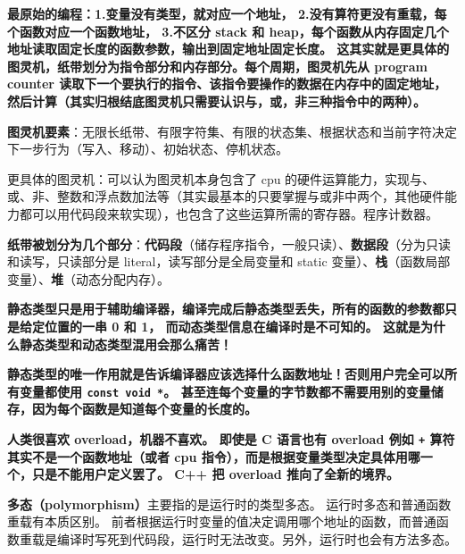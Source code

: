 
\begin{issues}
\issueDraft
\end{issues}

\textbf{最原始的编程：1.变量没有类型，就对应一个地址， 2.没有算符更没有重载，每个函数对应一个函数地址， 3.不区分 stack 和 heap，每个函数从内存固定几个地址读取固定长度的函数参数，输出到固定地址固定长度。 这其实就是更具体的图灵机，纸带划分为指令部分和内存部分。每个周期，图灵机先从 program counter 读取下一个要执行的指令、该指令要操作的数据在内存中的固定地址，然后计算（其实归根结底图灵机只需要认识与，或，非三种指令中的两种）。}

\textbf{图灵机要素}：无限长纸带、有限字符集、有限的状态集、根据状态和当前字符决定下一步行为（写入、移动）、初始状态、停机状态。

更具体的图灵机：可以认为图灵机本身包含了 cpu 的硬件运算能力，实现与、或、非、整数和浮点数加法等（其实最基本的只要掌握与或非中两个，其他硬件能力都可以用代码段来软实现），也包含了这些运算所需的寄存器。程序计数器。

\textbf{纸带被划分为几个部分}：\textbf{代码段}（储存程序指令，一般只读）、\textbf{数据段}（分为只读和读写，只读部分是 literal，读写部分是全局变量和 static 变量）、\textbf{栈}（函数局部变量）、\textbf{堆}（动态分配内存）。

\textbf{静态类型只是用于辅助编译器，编译完成后静态类型丢失，所有的函数的参数都只是给定位置的一串 0 和 1， 而动态类型信息在编译时是不可知的。 这就是为什么静态类型和动态类型混用会那么痛苦！}

\textbf{静态类型的唯一作用就是告诉编译器应该选择什么函数地址！否则用户完全可以所有变量都使用 \verb`const void *`。 甚至连每个变量的字节数都不需要用别的变量储存，因为每个函数是知道每个变量的长度的。}

\textbf{人类很喜欢 overload，机器不喜欢。 即使是 C 语言也有 overload 例如 \verb`+` 算符其实不是一个函数地址（或者 cpu 指令），而是根据变量类型决定具体用哪一个，只是不能用户定义罢了。 C++ 把 overload 推向了全新的境界。}

\textbf{多态（polymorphism）}主要指的是运行时的类型多态。 运行时多态和普通函数重载有本质区别。 前者根据运行时变量的值决定调用哪个地址的函数，而普通函数重载是编译时写死到代码段，运行时无法改变。另外，运行时也会有方法多态。


